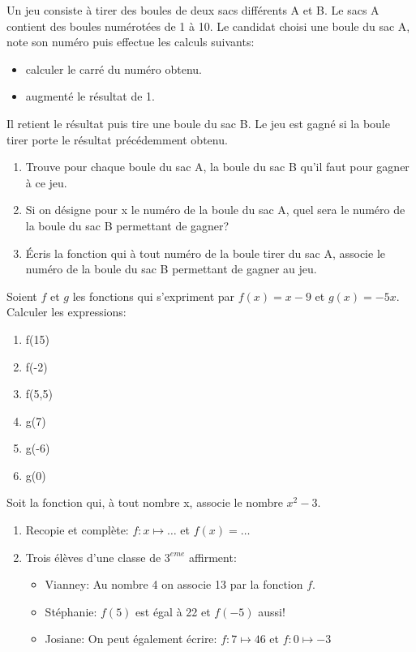 \documentclass[nocrop]{sesamanuel}
\begin{document}
\exercicesbase
\begin{colonne*exercice}
\begin{exercice}[J'ai gagné!!!]
Un jeu consiste à tirer des boules de deux sacs différents A et B. Le sacs A contient des boules numérotées de 1 à 10. Le candidat choisi une boule du sac A, note son numéro puis effectue les calculs suivants:
\begin{itemize}
\item calculer le carré du numéro obtenu.
\item augmenté le résultat de 1.
\end{itemize}

Il retient le résultat puis tire une boule du sac B.
Le jeu est gagné si la boule tirer porte le résultat précédemment obtenu.
\begin{enumerate}
\item Trouve pour chaque boule du sac A, la boule du sac B qu'il faut pour gagner à ce jeu.
\item Si on désigne pour x le numéro de la boule du sac A, quel sera le numéro de la boule du sac B permettant de gagner?
\item Écris la fonction qui à tout numéro de la boule tirer du sac A, associe le numéro de la boule du sac B permettant de gagner au jeu.
\end{enumerate}
\end{exercice}

\begin{exercice}
Soient $f$ et $g$ les fonctions qui s'expriment par $f(x)=x-9$ et $g(x)=-5x$. Calculer les expressions:
\begin{multicols}{3}
\begin{enumerate}
\item f(15)
\item f(-2)
\item f(5,5)
\item g(7)
\item g(-6)
\item g(0)
\end{enumerate}
\end{multicols}

\end{exercice}

\begin{exercice}
Soit la fonction qui, à tout nombre x, associe le nombre $x^2-3$.
\begin{enumerate}
\item Recopie et complète: $f: x \mapsto \ldots$ et $f(x)=\ldots$
\item Trois élèves d'une classe de $3^{eme}$ affirment:
\begin{itemize}
\item Vianney:
Au nombre 4 on associe 13 par la fonction $f$.
\item Stéphanie:
$f(5)$ est égal à 22 et $f(-5)$ aussi! 
\item Josiane:
On peut également écrire: $f: 7 \mapsto 46$ et $f: 0 \mapsto -3$
\end{itemize}
\end{enumerate}
\end{exercice}


\end{colonne*exercice}
\end{document}
